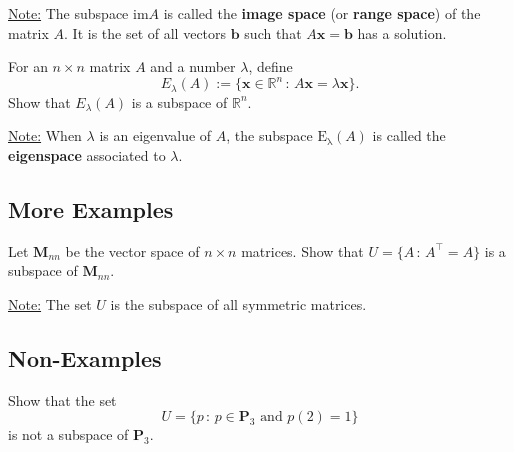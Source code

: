 \documentclass[20pt,a4paper]{extarticle}
\newcounter{example}
\begin{document}
\begin{solution}

\end{solution}

\vfill 

\underline{Note:} The subspace $\mathrm{im} A$ is called the \textbf{image space} (or \textbf{range space}) of the matrix $A$. It is the set of all vectors $\mathbf{b}$ such that $A \mathbf{x} = \mathbf{b}$ has a solution.

\newpage 

\begin{example}
For an $n \times n$ matrix $A$ and a number $\lambda$, define
	\[
		E_\lambda (A) := \{ \mathbf{x} \in \mathbb{R}^n \, : \, A \mathbf{x} = \lambda \mathbf{x} \} .
	\]
Show that $E_{\lambda} (A)$ is a subspace of $\mathbb{R}^n$. 
\end{example}

\begin{solution}

\end{solution}

\vfill 

\underline{Note:} When $\lambda$ is an eigenvalue of $A$, the subspace $\mathrm{E_\lambda} (A)$ is called the \textbf{eigenspace} associated to $\lambda$. 

\newpage 

\subsection{More Examples}

\begin{example}
Let $\mathbf{M}_{nn}$ be the vector space of $n \times n$ matrices. Show that $U = \{ A \, : \, A^\top = A \}$ is a subspace of $\mathbf{M}_{nn}$. 
\end{example}

\begin{solution}

\end{solution}

\vfill 

\underline{Note:} The set $U$ is the subspace of all symmetric matrices.

\newpage 

\subsection{Non-Examples}

\begin{example}
Show that the set
	\[
		U = \{ p \, : \, p \in \mathbf{P}_3 \text{ and } p (2) = 1 \}
	\]
is not a subspace of $\mathbf{P}_3$.
\end{example}
\end{document}
